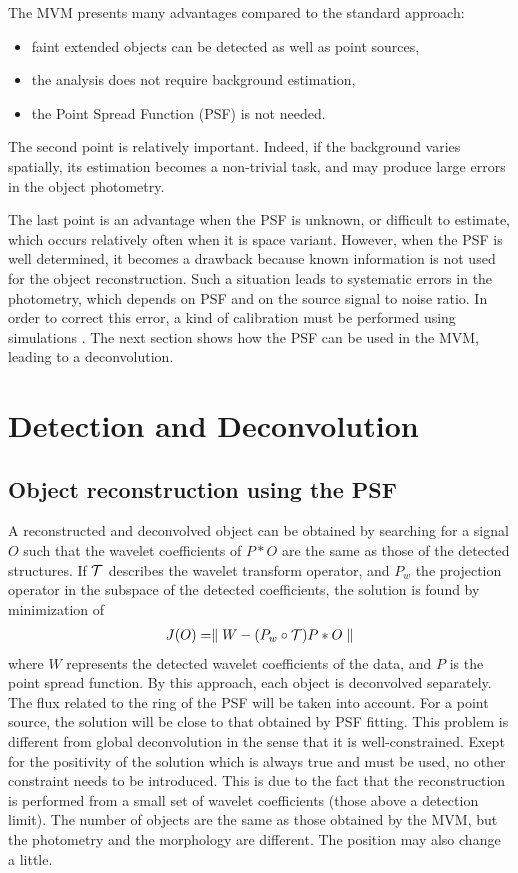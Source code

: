 The MVM presents many advantages compared to the standard approach:
\begin{itemize}
\item faint extended objects can be detected as well as point sources,
\item the analysis does not require background estimation,
\item the Point Spread Function (PSF) is not needed.
\end{itemize}
The second point is relatively important. Indeed, if the background varies
spatially, its estimation becomes a non-trivial task, and may produce 
large errors in the object photometry.

The last point is an advantage when the PSF is unknown, or difficult to 
estimate, which occurs relatively often when it is space variant.
However, when the PSF is well determined, it becomes a drawback because
known information is not used for the object reconstruction. 
Such a situation leads to
systematic errors in the photometry, which depends on PSF and on the source 
signal to noise ratio.
In order to correct this error, a kind of calibration must be performed using
simulations \cite{starck:sta99_4}. The 
next section shows how the PSF can be used
in the MVM, leading to a deconvolution.

\section{Detection and Deconvolution}
\subsection{Object reconstruction using the PSF}
A reconstructed and deconvolved object can be obtained
by searching for a signal $O$ such that
the wavelet coefficients of $P*O$ are the same as those of the detected
structures. If $\cal T$ describes the wavelet transform operator, 
and $P_w$ the projection operator in the subspace of the detected coefficients,
 the solution is found by minimization of
\begin{eqnarray}
J(O) = \parallel W - (P_w \circ {\cal T}) P * O  \parallel
\end{eqnarray}
where $W$ represents the detected wavelet coefficients of the data, and 
$P$ is the point spread function. By this approach, each object is deconvolved
separately. The flux related to the ring of the PSF will be taken into 
account. For a point source, the solution will be close to that obtained by
PSF fitting. This problem is different from global deconvolution 
in the sense that it is well-constrained. Exept for the 
positivity of the solution
which is always true and must be used, no other constraint needs to
be introduced. This is due to the fact that the reconstruction is performed
from a small set of wavelet coefficients (those above a detection limit).
The number of objects are the same as those obtained by the MVM, but
the photometry and the morphology are different. The position may also change
a little.

